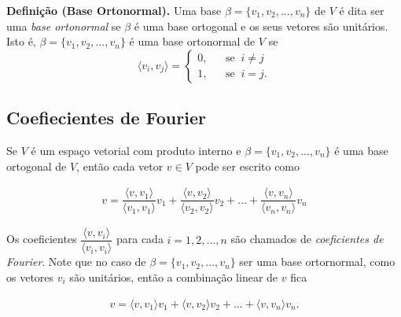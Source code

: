\vspace{0.7cm}
\textbf{Definição (Base Ortonormal).} Uma base  $ \beta =\{v_1, v_2,...,v_n\}$  de $ V$ é dita ser uma \textit{base ortonormal} se  $\beta$  é uma base ortogonal e os seus vetores são unitários.  Isto é,  $ \beta =\{v_1, v_2,...,v_n\}$ é uma base ortonormal  de $V$  se
$$ \langle v_i, v_j \rangle =\left\{
 \begin{array}{ccc}   0,&  & \text{se} \; \; i \neq j \\ 1, && \text{se}\; \;  i=j.\end{array}\right.$$




\subsection {\textbf{Coefiecientes de Fourier}}

Se $V$ é um espaço vetorial com produto interno e $ \beta =\{v_1, v_2,...,v_n\}$  é uma base ortogonal de $V$, então  cada vetor $ v \in V$ pode ser escrito como

\begin{align}
v=\dfrac{\langle v, v_1 \rangle}{\langle v_1, v_1 \rangle} v_1 +\dfrac{ \langle v, v_2 \rangle }{\langle v_2, v_2 \rangle}v_2+...+ \dfrac{\langle v, v_n \rangle}{\langle v_n, v_n \rangle} v_n
\end{align}

Os coeficientes  $\dfrac{\langle v, v_i \rangle}{\langle v_i, v_i \rangle}$ para cada $i=1,2,...,n$ são chamados de \textit{coeficientes de Fourier}. Note que  no  caso de  $ \beta =\{v_1, v_2,...,v_n\}$  ser uma base ortornormal, como os vetores $v_i$ são unitários, então a combinação linear de $v$ fica

\begin{align}
v={\langle v, v_1 \rangle} v_1 +{ \langle v, v_2 \rangle }v_2+...+{\langle v, v_n \rangle} v_n.
\end{align}

